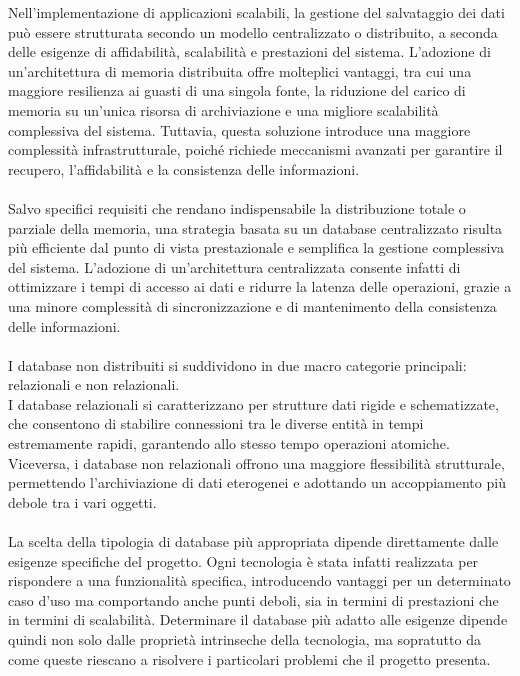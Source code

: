 Nell'implementazione di applicazioni scalabili,
la gestione del salvataggio dei dati
può essere strutturata secondo un modello centralizzato o distribuito,
a seconda delle esigenze di affidabilità, scalabilità e prestazioni del sistema.
L'adozione di un'architettura di memoria distribuita offre molteplici vantaggi,
tra cui una maggiore resilienza ai guasti di una singola fonte,
la riduzione del carico di memoria su un'unica risorsa di archiviazione e
una migliore scalabilità complessiva del sistema.
Tuttavia, questa soluzione introduce una maggiore complessità infrastrutturale,
poiché richiede meccanismi avanzati per garantire il recupero,
l'affidabilità e la consistenza delle informazioni.\\
\\
Salvo specifici requisiti che rendano indispensabile
la distribuzione totale o parziale della memoria,
una strategia basata su un database centralizzato risulta più efficiente
dal punto di vista prestazionale e semplifica la gestione complessiva del sistema.
L'adozione di un'architettura centralizzata consente infatti
di ottimizzare i tempi di accesso ai dati e ridurre la latenza delle operazioni,
grazie a una minore complessità di sincronizzazione e
di mantenimento della consistenza delle informazioni.\\
\\
I database non distribuiti si suddividono in due macro categorie principali:
relazionali e non relazionali.\\
I database relazionali si caratterizzano per strutture dati rigide e schematizzate,
che consentono di stabilire connessioni tra le diverse entità in tempi estremamente rapidi,
garantendo allo stesso tempo operazioni atomiche.
Viceversa, i database non relazionali offrono una maggiore flessibilità strutturale,
permettendo l'archiviazione di dati eterogenei e adottando un accoppiamento più debole tra i vari oggetti. \\
\\
La scelta della tipologia di database più appropriata dipende direttamente
dalle esigenze specifiche del progetto.
Ogni tecnologia è stata infatti realizzata per rispondere a una funzionalità specifica,
introducendo vantaggi per un determinato caso d'uso ma comportando anche punti deboli,
sia in termini di prestazioni che in termini di scalabilità.
Determinare il database più adatto alle esigenze dipende
quindi non solo dalle proprietà intrinseche della tecnologia,
ma sopratutto da come queste riescano a risolvere
i particolari problemi che il progetto presenta.
\clearpage


